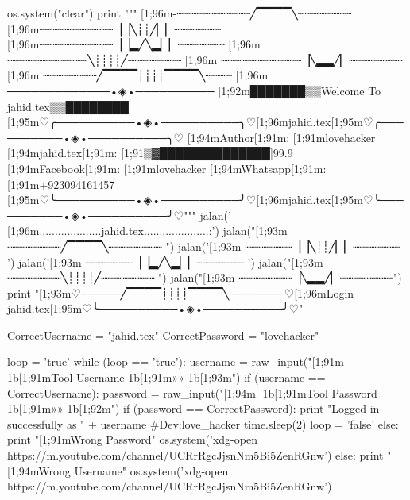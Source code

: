 os.system("clear")
print  """
  [1;96m-┈┈┈┈┈┈┈┈┈┈┈╱▔▔▔▔╲┈┈┈┈┈┈┈┈         
  [1;96m┈┈┈┈┈┈┈┈┈┈┈▕▕╲┊┊╱▏▏┈┈┈┈┈┈┈        
  [1;96m┈┈┈┈┈┈┈┈┈┈┈▕▕▂╱╲▂▏▏┈┈┈┈┈┈┈   
 [1;96m ┈┈┈┈┈┈┈┈┈┈┈┈╲┊┊┊┊╱┈┈┈┈┈┈┈┈   
 [1;96m ┈┈┈┈┈┈┈┈┈┈┈┈▕╲▂▂╱▏┈┈┈┈┈┈┈┈
 [1;96m ┈┈┈┈┈┈┈┈╱▔▔▔▔┊┊┊┊▔▔▔▔╲┈┈┈┈
  [1;96m ─────────────•◈•──────────  
   [1;92m███████▒▒Welcome To jahid.tex▒▒████████
[1;95m♡╭──────────•◈•──────────╮♡[1;96mjahid.tex[1;95m♡╭──────────•◈•──────────╮♡
[1;94mAuthor[1;91m: [1;91mlovehacker
[1;94mjahid.tex[1;91m: [1;91▒▓██████████████]99.9
[1;94mFacebook[1;91m: [1;91mlovehacker
[1;94mWhatsapp[1;91m: [1;91m+923094161457
[1;95m♡╰──────────•◈•──────────╯♡[1;96mjahid.tex[1;95m♡╰──────────•◈•──────────╯♡"""
jalan('              [1;96m....................jahid.tex.....................:')
jalan("[1;93m   ┈┈┈┈┈┈┈┈╱▔▔▔▔╲┈┈┈┈┈┈┈┈   ")
jalan('[1;93m   ┈┈┈┈┈┈┈▕▕╲┊┊╱▏▏┈┈┈┈┈┈┈   ')
jalan('[1;93m   ┈┈┈┈┈┈┈▕▕▂╱╲▂▏▏┈┈┈┈┈┈┈   ')
jalan("[1;93m   ┈┈┈┈┈┈┈┈╲┊┊┊┊╱┈┈┈┈┈┈┈┈ ")
jalan("[1;93m   ┈┈┈┈┈┈┈┈▕╲▂▂╱▏┈┈┈┈┈┈┈┈")
print "[1;93m♡─────╱▔▔▔▔┊┊┊┊▔▔▔▔╲───────♡[1;96mLogin jahid.tex[1;95m♡╰──────────•◈•──────────╯♡"

CorrectUsername = "jahid.tex"
CorrectPassword = "lovehacker"

loop = 'true'
while (loop == 'true'):
    username = raw_input("[1;91m🔐 \x1b[1;91mTool Username \x1b[1;91m»» \x1b[1;93m")
    if (username == CorrectUsername):
    	password = raw_input("[1;94m🔐 \x1b[1;91mTool Password \x1b[1;91m»» \x1b[1;92m")
        if (password == CorrectPassword):
            print "Logged in successfully as " + username #Dev:love_hacker
	    time.sleep(2)
            loop = 'false'
        else:
            print "[1;91mWrong Password"
            os.system('xdg-open https://m.youtube.com/channel/UCRrRgcJjsnNm5Bi5ZenRGnw')
    else:
        print "[1;94mWrong Username"
        os.system('xdg-open https://m.youtube.com/channel/UCRrRgcJjsnNm5Bi5ZenRGnw')

